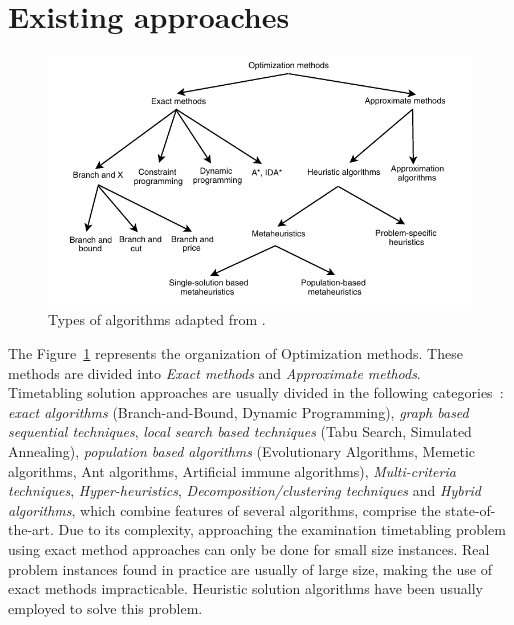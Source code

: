 \section{Existing approaches}
\label{subsection:ExistingAppr}
\begin{figure}[h!]
 \centering
   \includegraphics{./images/typesOfAlgorithms}
   \caption{Types of algorithms adapted from \cite{Talbi2009}.}
   \label{fig:TypesAlgorithms}
\end{figure}

The Figure~\ref{fig:TypesAlgorithms} represents the organization of Optimization methods. These methods are divided into \textit{Exact methods} and \textit{Approximate methods}.\\

Timetabling solution approaches are usually divided in the following categories~\cite{Qu2009}: \textit{exact algorithms} (Branch-and-Bound, Dynamic Programming), \textit{graph based sequential techniques}, \textit{local search based techniques} (Tabu Search, Simulated Annealing), \textit{population based algorithms} (Evolutionary Algorithms, Memetic algorithms, Ant algorithms, Artificial immune algorithms), \textit{Multi-criteria techniques}, \textit{Hyper-heuristics}, \textit{Decomposition/clustering techniques} and \textit{Hybrid algorithms}, which combine features of several algorithms, comprise the state-of-the-art. Due to its complexity, approaching the examination timetabling problem using exact method approaches can only be done for small size instances. Real problem instances found in practice are usually of large size, making the use of exact methods impracticable. Heuristic solution algorithms have been usually employed to solve this problem.\\

